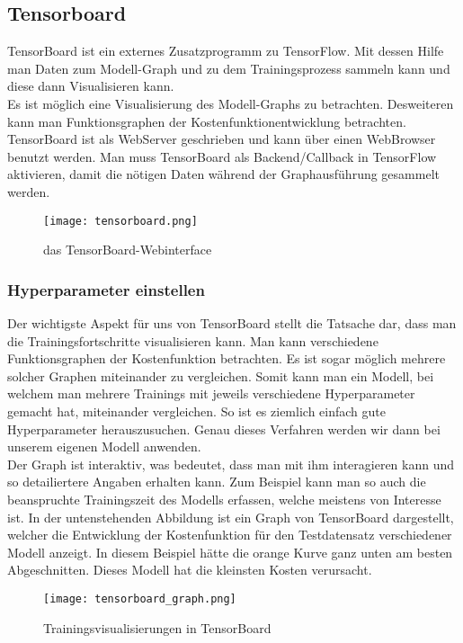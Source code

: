 \subsection{Tensorboard}
TensorBoard ist ein externes Zusatzprogramm zu TensorFlow. Mit dessen Hilfe
man Daten zum Modell-Graph und zu dem Trainingsprozess sammeln kann
und diese dann Visualisieren kann. \\
Es ist möglich eine Visualisierung des Modell-Graphs zu betrachten. Desweiteren
kann man Funktionsgraphen der Kostenfunktionentwicklung betrachten.
\para{}
TensorBoard ist als WebServer geschrieben und kann über einen WebBrowser
benutzt werden.
Man muss TensorBoard als Backend/Callback in TensorFlow aktivieren, damit die
nötigen Daten während der Graphausführung gesammelt werden.

\begin{figure}[h!]
  \centering
  \texttt{[image: tensorboard.png]}
  \caption{das TensorBoard-Webinterface}
\end{figure}

\subsubsection{Hyperparameter einstellen}
Der wichtigste Aspekt für uns von TensorBoard stellt die Tatsache dar, dass man
die Trainingsfortschritte visualisieren kann. Man kann verschiedene
Funktionsgraphen der Kostenfunktion betrachten. Es ist sogar möglich mehrere
solcher Graphen miteinander zu vergleichen. Somit kann man ein Modell, bei
welchem man mehrere Trainings mit jeweils verschiedene Hyperparameter gemacht
hat, miteinander vergleichen. So ist es ziemlich einfach gute Hyperparameter
herauszusuchen. Genau dieses Verfahren werden wir dann bei unserem eigenen
Modell anwenden. \\
Der Graph ist interaktiv, was bedeutet, dass man mit ihm interagieren kann und
so detailiertere Angaben erhalten kann. Zum Beispiel kann man so auch die
beanspruchte Trainingszeit des Modells erfassen, welche meistens von Interesse ist.
\para{}
In der untenstehenden Abbildung ist ein Graph von TensorBoard dargestellt,
welcher die Entwicklung der Kostenfunktion für den Testdatensatz verschiedener
Modell anzeigt. In diesem Beispiel hätte die orange Kurve ganz unten am besten
Abgeschnitten. Dieses Modell hat die kleinsten Kosten verursacht.

\begin{figure}[h!]
  \centering
  \texttt{[image: tensorboard\_graph.png]}
  \caption{Trainingsvisualisierungen in TensorBoard}
\end{figure}


